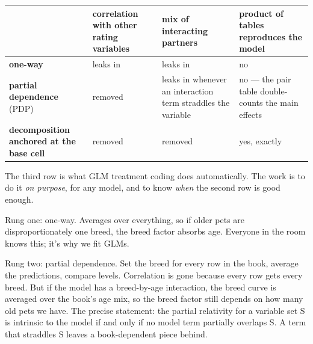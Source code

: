 \documentclass[
  letterpaper,
  DIV=11,
  numbers=noendperiod]{scrartcl}
\newcounter{none} %
\begin{document}
{\def\LTcaptype{none} %
\begin{longtable}[]{@{}
  >{\raggedright\arraybackslash}p{}
  >{\centering\arraybackslash}p{}
  >{\centering\arraybackslash}p{}
  >{\centering\arraybackslash}p{}@{}}
\toprule\noalign{}
\begin{minipage}[b]{\linewidth}\raggedright
\end{minipage} & \begin{minipage}[b]{\linewidth}\centering
correlation with other rating variables
\end{minipage} & \begin{minipage}[b]{\linewidth}\centering
mix of interacting partners
\end{minipage} & \begin{minipage}[b]{\linewidth}\centering
product of tables reproduces the model
\end{minipage} \\
\midrule\noalign{}
\endhead
\bottomrule\noalign{}
\endlastfoot
\textbf{one-way} & leaks in & leaks in & no \\
\textbf{partial dependence} (PDP) & removed & leaks in whenever an
interaction term straddles the variable & no --- the pair table
double-counts the main effects \\
\textbf{decomposition anchored at the base cell} & removed & removed &
yes, exactly \\
\end{longtable}
}

The third row is what GLM treatment coding does automatically. The work
is to do it \emph{on purpose}, for any model, and to know \emph{when}
the second row is good enough.

Rung one: one-way. Averages over everything, so if older pets are
disproportionately one breed, the breed factor absorbs age. Everyone in
the room knows this; it's why we fit GLMs.

Rung two: partial dependence. Set the breed for every row in the book,
average the predictions, compare levels. Correlation is gone because
every row gets every breed. But if the model has a breed-by-age
interaction, the breed curve is averaged over the book's age mix, so the
breed factor still depends on how many old pets we have. The precise
statement: the partial relativity for a variable set S is intrinsic to
the model if and only if no model term partially overlaps S. A term that
straddles S leaves a book-dependent piece behind.
\end{document}
